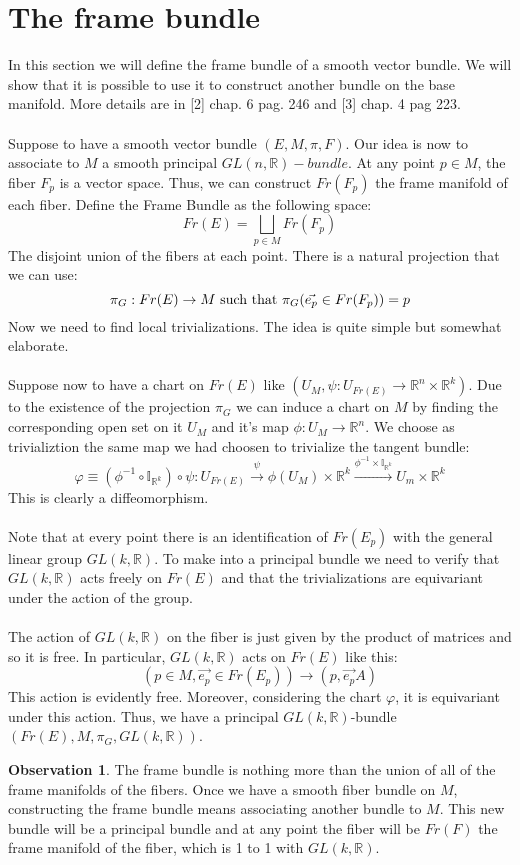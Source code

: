 \documentclass[12pt,a4paper]{report}
\theoremstyle{definition}
\theoremstyle{Theorem}
\theoremstyle{definition}
\theoremstyle{definition}
\newtheorem{Obs}[Def]{Observation}
\begin{document}
	\section{The frame bundle}
	In this section we will define the frame bundle of a smooth vector bundle. We will show that it is possible to use it to construct another bundle on the base manifold. More details are in [2] chap. 6 pag. 246 and [3] chap. 4 pag 223.\\
	\\
	Suppose to have a smooth vector bundle $(E,M,\pi,F)$. Our idea is now to associate to $M$ a smooth principal $GL(n,\mathbb{R})-bundle$. At any point $p\in M$, the fiber $F_p$ is a vector space. Thus, we can construct $Fr(F_p)$ the frame manifold of each fiber. Define the Frame Bundle as the following space:
	$$Fr(E)=\bigsqcup_{p\in M}Fr(F_p)$$
	The disjoint union of the fibers at each point. There is a natural projection that we can use:
	$$\pi_G:Fr(E)\rightarrow M\hbox{ such that } \pi_G(\vec{e_p}\in Fr(F_p))=p$$
	Now we need to find local trivializations. The idea is quite simple but somewhat elaborate.\\
	\\
	Suppose now to have a chart on $Fr(E)$ like $(U_{M},\psi:U_{Fr(E)}\rightarrow \mathbb{R}^n\times\mathbb{R}^k)$. Due to the existence of the projection $\pi_G$ we can induce a chart on $M$ by finding the corresponding open set on it $U_M$ and it's map $\phi:U_M\rightarrow \mathbb{R}^n$. We choose as trivializtion the same map we had choosen to trivialize the tangent bundle:
	$$\varphi\equiv(\phi^{-1}\circ \mathbb{I}_{\mathbb{R}^k})\circ \psi: U_{Fr(E)}\xrightarrow{\psi}\phi(U_M)\times\mathbb{R}^k\xrightarrow{\phi^{-1}\times\mathbb{I}_{\mathbb{R}^k}}U_m\times\mathbb{R}^k$$
	This is clearly a diffeomorphism.\\
	\\
	Note that at every point there is an identification of $Fr(E_p)$ with the general linear group $GL(k,\mathbb{R})$. To make into a principal bundle we need to verify that $GL(k,\mathbb{R})$ acts freely on $Fr(E)$ and that the trivializations are equivariant under the action of the group.\\
	\\
	The action of $GL(k,\mathbb{R})$ on the fiber is just given by the product of matrices and so it is free. In particular, $GL(k,\mathbb{R})$ acts on $Fr(E)$ like this:
	$$(p\in M,\vec{e_p}\in Fr(E_p))\longrightarrow(p,\vec{e_p}A)$$
	This action is evidently free. Moreover, considering the chart $\varphi$, it is equivariant under this action. Thus, we have a principal $GL(k,\mathbb{R})$-bundle $(Fr(E),M,\pi_G,GL(k,\mathbb{R}))$.
	\begin{Obs}
		The frame bundle is nothing more than the union of all of the frame manifolds of the fibers. Once we have a smooth fiber bundle on $M$, constructing the frame bundle means associating another bundle to $M$. This new bundle will be a principal bundle and at any point the fiber will be $Fr(F)$ the frame manifold of the fiber, which is 1 to 1 with $GL(k,\mathbb{R})$.
	\end{Obs}
\end{document}
